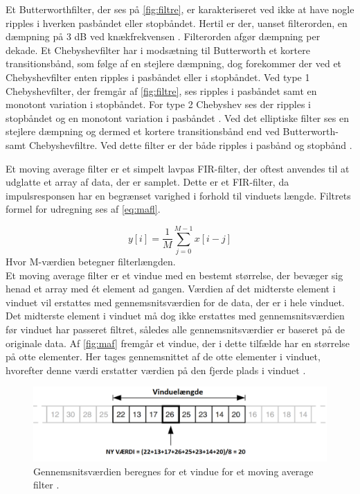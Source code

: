 \noindent
Et Butterworthfilter, der ses på \autoref{fig:filtre}, er karakteriseret ved ikke at have nogle ripples i hverken pasbåndet eller stopbåndet. 
Hertil er der, uanset filterorden, en dæmpning på 3 dB ved knækfrekvensen \citep{nilsson2015}. Filterorden afgør dæmpning per dekade.
Et Chebyshevfilter har i modsætning til Butterworth et kortere transitionsbånd, som følge af en stejlere dæmpning, dog forekommer der ved et Chebyshevfilter enten ripples i pasbåndet eller i stopbåndet. 
Ved type 1 Chebyshevfilter, der fremgår af \autoref{fig:filtre}, ses ripples i pasbåndet samt en monotont variation i stopbåndet. 
For type 2 Chebyshev ses der ripples i stopbåndet og en monotont variation i pasbåndet \citep{nilsson2015}. 
Ved det elliptiske filter ses en stejlere dæmpning og dermed et kortere transitionsbånd end ved Butterworth- samt Chebyshevfiltre. 
Ved dette filter er der både ripples i pasbånd og stopbånd \citep{nilsson2015}. 

\vspace{3mm}
\noindent
Et moving average filter er et simpelt lavpas FIR-filter, der oftest anvendes til at udglatte et array af data, der er samplet. 
Dette er et FIR-filter, da impulsresponsen har en begrænset varighed i forhold til vinduets længde. 
Filtrets formel for udregning ses af \autoref{eq:mafl}.

\begin{equation}
	y[i]=\dfrac{1}{M}\sum^{M-1}_{j=0} x[i-j]
\label{eq:mafl}
\end{equation}
\noindent
Hvor M-værdien betegner filterlængden. \\

\noindent 
Et moving average filter er et vindue med en bestemt størrelse, der bevæger sig henad et array med ét element ad gangen. 
Værdien af det midterste element i vinduet vil erstattes med gennemsnitsværdien for de data, der er i hele vinduet. 
Det midterste element i vinduet må dog ikke erstattes med gennemsnitsværdien før vinduet har passeret filtret, således alle gennemsnitsværdier er baseret på de originale data. 
Af \autoref{fig:maf} fremgår et vindue, der i dette tilfælde har en størrelse på otte elementer. 
Her tages gennemsnittet af de otte elementer i vinduet, hvorefter denne værdi erstatter værdien på den fjerde plads i vinduet \citep{atmel2002}.

\begin{figure} [H]
\centering
\includegraphics[width=1\textwidth]{figures/maf}
\caption{Gennemsnitsværdien beregnes for et vindue for et moving average filter \citep{atmel2002}.}
\label{fig:maf}
\end{figure} 

